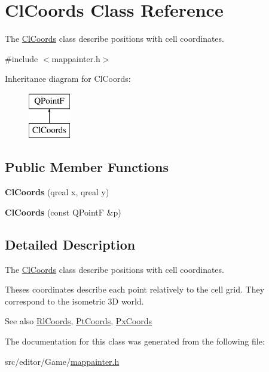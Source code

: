 \hypertarget{class_cl_coords}{}\section{Cl\+Coords Class Reference}
\label{class_cl_coords}


The \hyperlink{class_cl_coords}{Cl\+Coords} class describe positions with cell coordinates.  




{\ttfamily \#include $<$mappainter.\+h$>$}

Inheritance diagram for Cl\+Coords\+:\begin{figure}[H]
\begin{center}
\leavevmode
\includegraphics[height=2.000000cm]{class_cl_coords}
\end{center}
\end{figure}
\subsection*{Public Member Functions}
\begin{DoxyCompactItemize}
\item 
\hypertarget{class_cl_coords_a45685abe9c81595e2926edc414b425e7}{}\label{class_cl_coords_a45685abe9c81595e2926edc414b425e7} 
{\bfseries Cl\+Coords} (qreal x, qreal y)
\item 
\hypertarget{class_cl_coords_a48c6c4a46561da6e0a14ca6f3483426a}{}\label{class_cl_coords_a48c6c4a46561da6e0a14ca6f3483426a} 
{\bfseries Cl\+Coords} (const Q\+PointF \&p)
\end{DoxyCompactItemize}


\subsection{Detailed Description}
The \hyperlink{class_cl_coords}{Cl\+Coords} class describe positions with cell coordinates. 

Theses coordinates describe each point relatively to the cell grid. They correspond to the isometric 3D world.

\begin{DoxySeeAlso}{See also}
\hyperlink{class_rl_coords}{Rl\+Coords}, \hyperlink{class_pt_coords}{Pt\+Coords}, \hyperlink{class_px_coords}{Px\+Coords} 
\end{DoxySeeAlso}


The documentation for this class was generated from the following file\+:\begin{DoxyCompactItemize}
\item 
src/editor/\+Game/\hyperlink{mappainter_8h}{mappainter.\+h}\end{DoxyCompactItemize}
